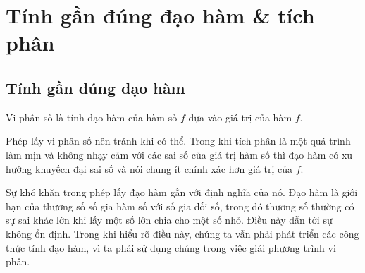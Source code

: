 \documentclass[../../Lectures]{subfiles}
\begin{document}
\chapter{Tính gần đúng đạo hàm \& tích phân}

\section{Tính gần đúng đạo hàm}

Vi phân số là tính đạo hàm của hàm số \(f\) dựa vào giá trị của hàm \(f\).

Phép lấy vi phân số nên tránh khi có thể. Trong khi tích phân là một quá trình
làm mịn và không nhạy cảm với các sai số của giá trị hàm số thì đạo hàm có xu
hướng khuyếch đại sai số và nói chung ít chính xác hơn giá trị của \(f\).

Sự khó khăn trong phép lấy đạo hàm gắn với định nghĩa của nó. Đạo hàm là giới
hạn của thương số số gia hàm số với số gia đối số, trong đó thương số thường có
sự sai khác lớn khi lấy một số lớn chia cho một số nhỏ. Điều này dẫn tới sự
không ổn định. Trong khi hiểu rõ điều này, chúng ta vẫn phải phát triển các công
thức tính đạo hàm, vì ta phải sử dụng chúng trong việc giải phương trình vi
phân.
\end{document}

